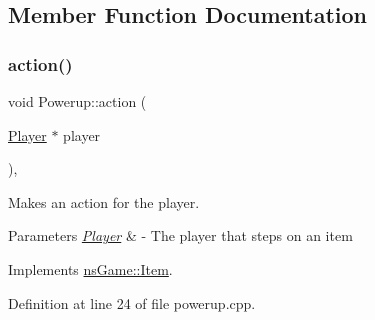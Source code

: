 \subsection{Member Function Documentation}
\mbox{\label{classns_game_1_1_powerup_af307aba7b61132f2dc037d8ef62581f9}} 
\subsubsection{\texorpdfstring{action()}{action()}}
{\footnotesize\ttfamily void Powerup\+::action (\begin{DoxyParamCaption}\item[{\hyperlink{classns_game_1_1_player}{Player} $\ast$}]{player }\end{DoxyParamCaption})\hspace{0.3cm}{\ttfamily [override]}, {\ttfamily [virtual]}}



Makes an action for the player. 


\begin{DoxyParams}{Parameters}
{\em \hyperlink{classns_game_1_1_player}{Player}} & -\/ The player that steps on an item \\
\hline
\end{DoxyParams}


Implements \hyperlink{structns_game_1_1_item_af74dffcf9bde4a4297749f4e1852395b}{ns\+Game\+::\+Item}.



Definition at line 24 of file powerup.\+cpp.

